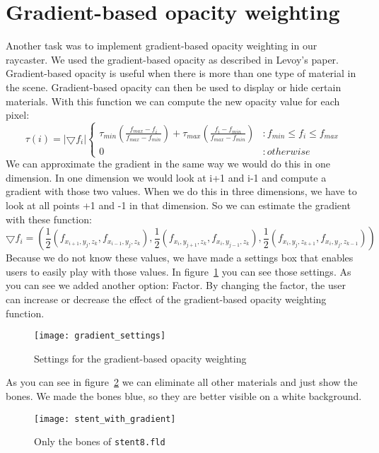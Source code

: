 \section{Gradient-based opacity weighting}\label{Sec:Gow}
Another task was to implement gradient-based opacity weighting in our raycaster.
We used the gradient-based opacity as described in Levoy’s paper.
Gradient-based opacity is useful when there is more than one type of  material in the scene. 
Gradient-based opacity can then be used to display or hide certain materials.
With this function we can compute the new opacity value for each pixel:
\[ \tau(i) = |\bigtriangledown f_{i}| \left\{
  \begin{array}{lr}
   \tau_{min} (\frac{ f_{max}- f_{i}}{ f_{max}- f_{min}}) +\tau_{max}( \frac{ f_{i}- f_{min}}{ f_{max}- f_{min}})  & : f_{min} \leq f_{i}  \leq f_{max} \\
    0 & : otherwise 
  \end{array}
\right.
\] 
We can approximate the gradient in the same way we would do this in one dimension. 
In one dimension we would look at i+1 and i-1 and compute a gradient with those two values.
When we do this in three dimensions, we have to look at all points +1 and -1 in that dimension.
So we can estimate the gradient with these function:
$$\bigtriangledown f_{i} = ( 
\frac{ 1}{2}( f_{x_{i+1},y_{j},z_{k}},f_{x_{i-1},y_{j},z_{k}} ),
\frac{ 1}{2}( f_{x_{i},y_{j+1},z_{k}},f_{x_{i},y_{j-1},z_{k}} ),
\frac{ 1}{2}( f_{x_{i},y_{j},z_{k+1}},f_{x_{i},y_{j},z_{k-1}} )) $$
Because we do not know these values, we have made a settings box that enables users to easily play with those values.
In figure~\ref{fig:gradient_settings} you can see those settings. 
As you can see we added another option: Factor. 
By changing the factor, the user can increase or decrease the effect of the gradient-based opacity weighting function.
\begin{figure}[H]
	\centering
		\texttt{[image: gradient\_settings]}
		\caption{Settings for the gradient-based opacity weighting}
	\label{fig:gradient_settings}
\end{figure}
As you can see in figure~\ref{fig:gradient} we can eliminate all other materials and just show the bones.
We made the bones blue, so they are better visible on a white background. 
\begin{figure}[H]
	\centering
		\texttt{[image: stent\_with\_gradient]}
		\caption{Only the bones of \texttt{stent8.fld}}
	\label{fig:gradient}
\end{figure}